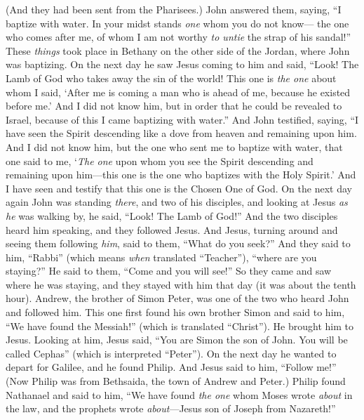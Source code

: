 \begin{biblechapter}
\verse (And they had been sent from the Pharisees.)
\verse John answered them, saying, “I baptize with water. In your midst stands \textit{one} whom you do not know—
\verse the one who comes after me, of whom I am not worthy \textit{to untie} the strap of his sandal!”
\verse These \textit{things} took place in Bethany on the other side of the Jordan, where John was baptizing.
\verse On the next day he saw Jesus coming to him and said, “Look! The Lamb of God who takes away the sin of the world!
\verse This one is \textit{the one} about whom I said, ‘After me is coming a man who is ahead of me, because he existed before me.’
\verse And I did not know him, but in order that he could be revealed to Israel, because of this I came baptizing with water.”
\verse And John testified, saying, “I have seen the Spirit descending like a dove from heaven and remaining upon him.
\verse And I did not know him, but the one who sent me to baptize with water, that one said to me, ‘\textit{The one} upon whom you see the Spirit descending and remaining upon him—this one is the one who baptizes with the Holy Spirit.’
\verse And I have seen and testify that this one is the Chosen One of God.
 On the next day again John was standing \textit{there}, and two of his disciples,
\verse and looking at Jesus \textit{as he} was walking by, he said, “Look! The Lamb of God!”
\verse And the two disciples heard him speaking, and they followed Jesus.
\verse And Jesus, turning around and seeing them following \textit{him}, said to them, “What do you seek?” And they said to him, “Rabbi” (which means \textit{when} translated “Teacher”), “where are you staying?”
\verse He said to them, “Come and you will see!” So they came and saw where he was staying, and they stayed with him that day (it was about the tenth hour).
 Andrew, the brother of Simon Peter, was one of the two who heard John and followed him.
\verse This one first found his own brother Simon and said to him, “We have found the Messiah!” (which is translated “Christ”).
\verse He brought him to Jesus. Looking at him, Jesus said, “You are Simon the son of John. You will be called Cephas” (which is interpreted “Peter”).
 On the next day he wanted to depart for Galilee, and he found Philip. And Jesus said to him, “Follow me!”
\verse (Now Philip was from Bethsaida, the town of Andrew and Peter.)
\verse Philip found Nathanael and said to him, “We have found \textit{the one} whom Moses wrote \textit{about} in the law, and the prophets wrote \textit{about}—Jesus son of Joseph from Nazareth!”

\end{biblechapter}
